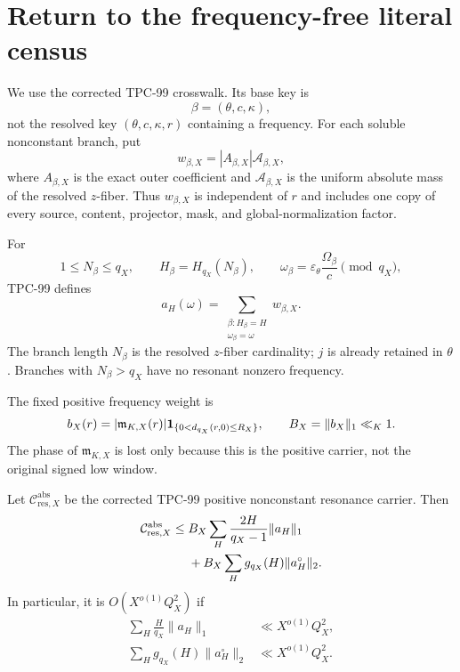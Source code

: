 \section{Return to the frequency-free literal census}
\label{sec:literal-interface}

We use the corrected TPC-99 crosswalk.  Its base key is
\[
 \beta=(\theta,c,\kappa),
\]
not the resolved key \((\theta,c,\kappa,r)\) containing a frequency.
For each soluble nonconstant branch, put
\[
 w_{\beta,X}
 =
 |A_{\beta,X}|\mathcal A_{\beta,X},
\]
where \(A_{\beta,X}\) is the exact outer coefficient and
\(\mathcal A_{\beta,X}\) is the uniform absolute mass of the
resolved \(z\)-fiber.  Thus \(w_{\beta,X}\) is independent of \(r\)
and includes one copy of every source, content, projector, mask, and
global-normalization factor.

For
\[
 1\le N_\beta\le q_X,\qquad
 H_\beta=H_{q_X}(N_\beta),\qquad
 \omega_\beta
 =
 \varepsilon_\theta\frac{\Omega_\beta}{c}
 \pmod{q_X},
\]
TPC-99 defines
\begin{equation}
 a_H(\omega)
 =
 \sum_{\substack{\beta:H_\beta=H\\
                  \omega_\beta=\omega}}
 w_{\beta,X}.
\label{eq:literal-census}
\end{equation}
The branch length \(N_\beta\) is the resolved \(z\)-fiber
cardinality; \(j\) is already retained in \(\theta\).  Branches with
\(N_\beta>q_X\) have no resonant nonzero frequency.

The fixed positive frequency weight is
\[
 b_X(r)
 =
 |\mathfrak m_{K,X}(r)|
 \mathbf 1_{\{0<d_{q_X}(r,0)\le R_X\}},
\qquad
 B_X=\|b_X\|_1\ll_K1.
\]
The phase of \(\mathfrak m_{K,X}\) is lost only because this is the
positive carrier, not the original signed low window.

\begin{theorem}
\label{thm:literal-width-bound}
Let \(\mathcal C_{\mathrm{res},X}^{\mathrm{abs}}\) be the corrected
TPC-99 positive nonconstant resonance carrier.  Then
\begin{align}
 \mathcal C_{\mathrm{res},X}^{\mathrm{abs}}
 \le{}&
 B_X
 \sum_H\frac{2H}{q_X-1}\|a_H\|_1
\notag\\
 &+
 B_X\sum_Hg_{q_X}(H)\|a_H^\circ\|_2.
\label{eq:literal-width-bound}
\end{align}
In particular, it is \(O(X^{o(1)}Q_X^2)\) if
\begin{align}
 \sum_H\frac{H}{q_X}\|a_H\|_1
 &\ll X^{o(1)}Q_X^2,
\label{eq:new-principal-gate}\\
 \sum_Hg_{q_X}(H)\|a_H^\circ\|_2
 &\ll X^{o(1)}Q_X^2.
\label{eq:new-centered-gate}
\end{align}
\end{theorem}


